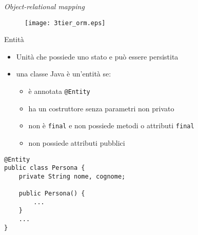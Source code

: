 \begin{frame}{\textsl{Object-relational mapping}}

\begin{figure}
	\centering
	\texttt{[image: 3tier\_orm.eps]}
\end{figure}

\end{frame}



\begin{frame}[fragile]{Entità}


\begin{itemize}
\item Unità che possiede uno stato e può essere persistita

\vspace{0.6em}

\item una classe Java è un'entità se:
	\begin{itemize}
	
	\vspace{0.3em}
	
	\item è annotata \texttt{@Entity}
	
	\vspace{0.5em}
	
	\item ha un costruttore senza parametri non privato
	
	\vspace{0.5em}
	
	\item non è \texttt{final} e non possiede metodi o attributi \texttt{final}
	
	\vspace{0.5em}
	
	\item non possiede attributi pubblici
	\end{itemize}
\end{itemize}


\begin{lstlisting}[xleftmargin=0.3\textwidth,  basicstyle={\tiny\ttfamily}]
@Entity
public class Persona {
    private String nome, cognome;
    
    public Persona() {
        ...
    }
    ...
}
\end{lstlisting}



\end{frame}



